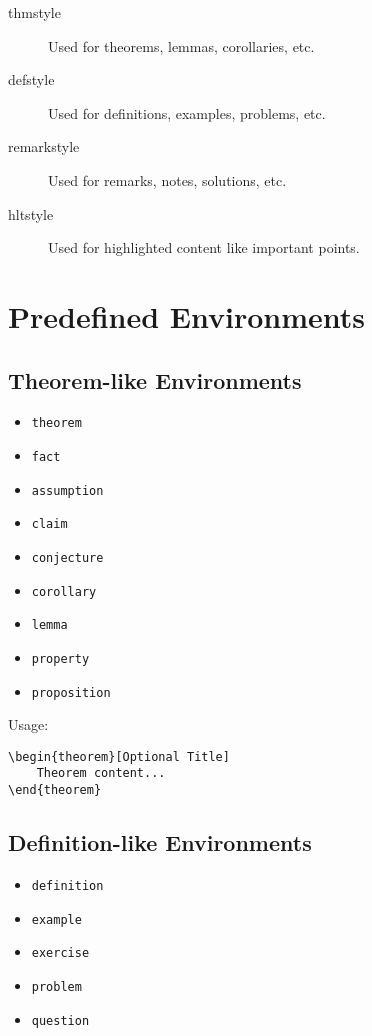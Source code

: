 \documentclass{ltxdoc}
\newcommand{\env}[1]{\texttt{#1}}
\begin{document}
\begin{description}
	\item[thmstyle] Used for theorems, lemmas, corollaries, etc.
	\item[defstyle] Used for definitions, examples, problems, etc.
	\item[remarkstyle] Used for remarks, notes, solutions, etc.
	\item[hltstyle] Used for highlighted content like important points.
\end{description}

\section{Predefined Environments}

\subsection{Theorem-like Environments}

\begin{itemize}
	\item \env{theorem}
	\item \env{fact}
	\item \env{assumption}
	\item \env{claim}
	\item \env{conjecture}
	\item \env{corollary}
	\item \env{lemma}
	\item \env{property}
	\item \env{proposition}
\end{itemize}

Usage:
\begin{verbatim}
\begin{theorem}[Optional Title]
    Theorem content...
\end{theorem}
\end{verbatim}

\subsection{Definition-like Environments}

\begin{itemize}
	\item \env{definition}
	\item \env{example}
	\item \env{exercise}
	\item \env{problem}
	\item \env{question}
\end{itemize}
\end{document}
